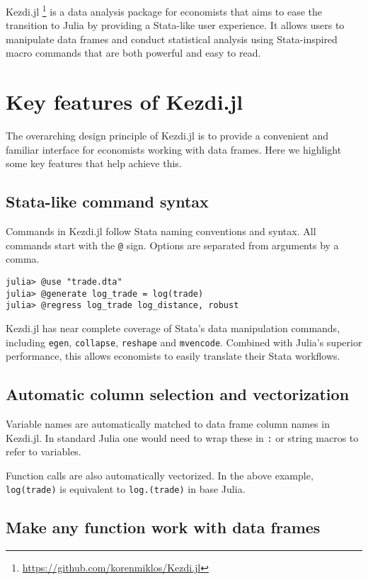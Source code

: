 \documentclass{juliacon}
\begin{document}
Kezdi.jl \footnote{\url{https://github.com/korenmiklos/Kezdi.jl}} is a data analysis package for economists that aims to ease the transition to Julia by providing a Stata-like user experience. It allows users to manipulate data frames and conduct statistical analysis using Stata-inspired macro commands that are both powerful and easy to read.

\section{Key features of Kezdi.jl}

The overarching design principle of Kezdi.jl is to provide a convenient and familiar interface for economists working with data frames. Here we highlight some key features that help achieve this.

\subsection{Stata-like command syntax}

Commands in Kezdi.jl follow Stata naming conventions and syntax. All commands start with the \texttt{@} sign. Options are separated from arguments by a comma.

\begin{verbatim}
julia> @use "trade.dta"
julia> @generate log_trade = log(trade)
julia> @regress log_trade log_distance, robust
\end{verbatim}

Kezdi.jl has near complete coverage of Stata's data manipulation commands, including \texttt{egen}, \texttt{collapse}, \texttt{reshape} and \texttt{mvencode}. Combined with Julia's superior performance, this allows economists to easily translate their Stata workflows.

\subsection{Automatic column selection and vectorization}

Variable names are automatically matched to data frame column names in Kezdi.jl. In standard Julia one would need to wrap these in \texttt{:} or string macros to refer to variables.

Function calls are also automatically vectorized. In the above example, \texttt{log(trade)} is equivalent to \texttt{log.(trade)} in base Julia.

\subsection{Make any function work with data frames}
\end{document}

